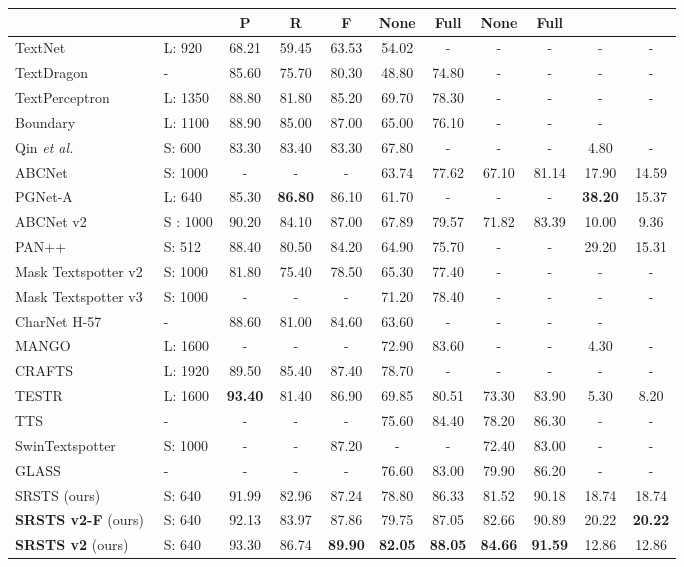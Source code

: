\begin{table*}[t]
\begin{tabular}{l|l|ccccccc|cc}
& &P&R&F &None& Full &None& Full \\
    \midrule
    TextNet~\cite{sun2018textnet}&L: 920&  68.21& 59.45  &63.53 & 54.02 & -&-&-&-&-\\
    TextDragon~\cite{feng2019textdragon}&-& 85.60 &  75.70&  80.30& 48.80 &74.80&-&-&-&-\\
    TextPerceptron~\cite{qiao2020text}&L: 1350&  88.80&81.80& 85.20& 69.70&78.30&-&-&-&- \\
    Boundary~\cite{wang2020all}&L: 1100& 88.90& 85.00&  87.00& 65.00 &76.10&-&-&-\\
    Qin \textit{et al.}~\cite{wang2020all}&S: 600& 83.30 & 83.40&	83.30& 67.80& -&-&-&4.80&-\\
    ABCNet~\cite{liu2020abcnet}&S: 1000&  -& - & -& 63.74& 77.62& 67.10 &81.14&17.90&14.59 \\
    PGNet-A~\cite{wang2021pgnet} &L: 640 & 85.30&\textbf{86.80}& 86.10 &61.70&- &- &-&\textbf{38.20}& 15.37\\
    ABCNet v2~\cite{liu2021abcnet} &S : 1000&  90.20&84.10& 87.00& 67.89& 79.57& 71.82& 83.39&10.00&9.36\\
    PAN++~\cite{wang2021pan++}&S: 512 & 88.40 & 80.50 &84.20 & 64.90 & 75.70 &- &-&29.20 & 15.31\\
    Mask Textspotter v2~\cite{liao2019mask}&S: 1000& 81.80  &75.40  & 78.50& 65.30& 77.40&-&-&-&-\\ 
    Mask Textspotter v3~\cite{liao2020mask} &S: 1000 & -& -& -&71.20& 78.40&-&-&-&-\\
    CharNet H-57~\cite{xing2019convolutional} & -& 88.60&81.00 &84.60&63.60&-&-&-&-\\
    MANGO~\cite{qiao2020mango} &L: 1600 & -& -&-&72.90 &83.60&-&-&4.30&- \\
    CRAFTS~\cite{baek2020character}&L: 1920 &89.50&85.40 &	87.40&78.70 & -&-&- &-&-\\
TESTR~\cite{zhang2022text} &L: 1600&  \textbf{93.40} & 81.40&  86.90 &69.85& 80.51& 73.30 & 83.90 &5.30&8.20\\
    TTS~\cite{kittenplon2022towards}&-& - &-&-& 75.60 & 84.40& 78.20&  86.30&-&- \\ 
    SwinTextspotter~\cite{huang2022swintextspotter}&S: 1000& - &- & 87.20 &- &- & 72.40 &83.00 & -&-\\
    GLASS~\cite{ronen2022glass} &-&-&-&-&76.60& 83.00&79.90& 86.20&-&-\\ 
    \midrule
    SRSTS (ours)~\cite{wu2022decoupling}& S: 640 &91.99&82.96&87.24&78.80&86.33 &81.52 &90.18&18.74&18.74\\
    \textbf{SRSTS v2-F} (ours) & S: 640& 92.13  &83.97 &87.86&79.75& 87.05 &82.66 &90.89 &20.22 &\textbf{20.22}  \\
    \textbf{SRSTS v2} (ours) &S: 640 & 93.30& 86.74&
\textbf{89.90} &\textbf{82.05}& \textbf{88.05}&\textbf{84.66}&\textbf{91.59} & 12.86& 12.86  \\
    \bottomrule
  \end{tabular}
\end{table*} 
